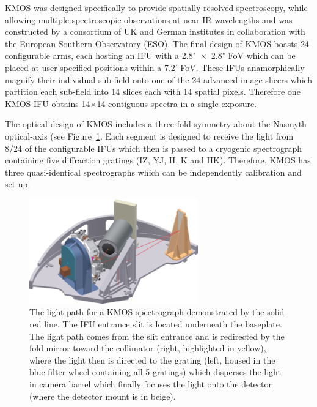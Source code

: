 KMOS was designed specifically to provide spatially resolved spectroscopy, while allowing multiple spectroscopic observations at near-IR wavelengths and was constructed by a consortium of UK and German institutes in collaboration with the European Southern Observatory (ESO).
The final design of KMOS boasts 24 configurable arms, each hosting an IFU with a 2.8"~$\times$~2.8" FoV which can be placed at user-specified positions within a 7.2' FoV.
These IFUs anamorphically magnify their individual sub-field onto one of the 24 advanced image slicers which partition each sub-field into 14 slices each with 14 spatial pixels.
Therefore one KMOS IFU obtains 14$\times$14 contiguous spectra in a single exposure.

The optical design of KMOS includes a three-fold symmetry about the Nasmyth optical-axis (see Figure~\ref{fig:kmoslight}.
Each segment is designed to receive the light from 8/24 of the configurable IFUs which then is passed to a cryogenic spectrograph containing five diffraction gratings (IZ, YJ, H, K and HK).
Therefore, KMOS has three quasi-identical spectrographs which can be independently calibration and set up.

\begin{figure}
 \centering
 \includegraphics[width=0.65\textwidth]{kmos/kmos-spectrograph}
 \caption[The KMOS light path]{The light path for a KMOS spectrograph demonstrated by the solid red line.
 The IFU entrance slit is located underneath the baseplate.
 The light path comes from the slit entrance and is redirected by the fold mirror toward the collimator (right, highlighted in yellow), where the light then is directed to the grating (left, housed in the blue filter wheel containing all 5 gratings) which disperses the light in camera barrel which finally focuses the light onto the detector (where the detector mount is in beige).
 \label{fig:kmoslight}}
\end{figure}

